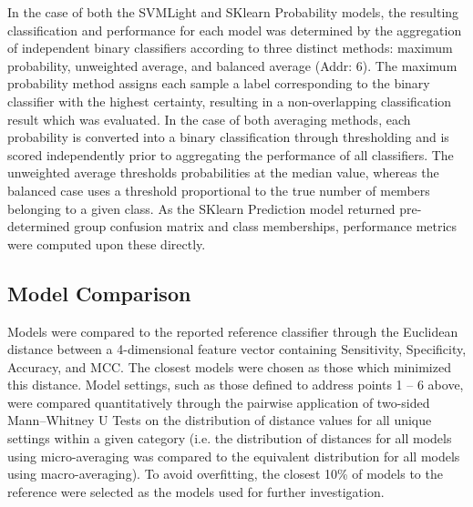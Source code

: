 In the case of both the SVMLight and SKlearn Probability models, the resulting classification and performance for each
model was determined by the aggregation of independent binary classifiers according to three distinct methods: maximum
probability, unweighted average, and balanced average (Addr: 6). The maximum probability method assigns each sample a
label corresponding to the binary classifier with the highest certainty, resulting in a non-overlapping classification
result which was evaluated. In the case of both averaging methods, each probability is converted into a binary
classification through thresholding and is scored independently prior to aggregating the performance of all classifiers.
The unweighted average thresholds probabilities at the median value, whereas the balanced case uses a threshold
proportional to the true number of members belonging to a given class. As the SKlearn Prediction model returned
pre-determined group confusion matrix and class memberships, performance metrics were computed upon these directly.

\subsection{Model Comparison}
Models were compared to the reported reference classifier through the Euclidean distance between a 4-dimensional
feature vector containing Sensitivity, Specificity, Accuracy, and MCC. The closest models were chosen as those which
minimized this distance. Model settings, such as those defined to address points 1 -- 6 above, were compared
quantitatively through the pairwise application of two-sided Mann–Whitney U Tests on the distribution of distance
values for all unique settings within a given category (i.e. the distribution of distances for all models using
micro-averaging was compared to the equivalent distribution for all models using macro-averaging). To avoid
overfitting, the closest 10\% of models to the reference were selected as the models used for further investigation.


